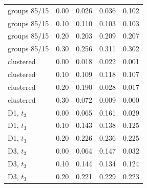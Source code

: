 {\begin{longtable}{llccc}
groups 85/15 & 0.00 & 0.026 & 0.036 & 0.102 \\
groups 85/15 & 0.10 & 0.110 & 0.103 & 0.103 \\
groups 85/15 & 0.20 & 0.203 & 0.209 & 0.207 \\
groups 85/15 & 0.30 & 0.256 & 0.311 & 0.302 \\
clustered & 0.00 & 0.018 & 0.022 & 0.001 \\
clustered & 0.10 & 0.109 & 0.118 & 0.107 \\
clustered & 0.20 & 0.190 & 0.028 & 0.017 \\
clustered & 0.30 & 0.072 & 0.009 & 0.000 \\
D1, $t_3$ & 0.00 & 0.065 & 0.161 & 0.029 \\
D1, $t_3$ & 0.10 & 0.143 & 0.138 & 0.125 \\
D1, $t_3$ & 0.20 & 0.226 & 0.236 & 0.225 \\
D3, $t_3$ & 0.00 & 0.064 & 0.147 & 0.032 \\
D3, $t_3$ & 0.10 & 0.144 & 0.134 & 0.124 \\
D3, $t_3$ & 0.20 & 0.221 & 0.229 & 0.223 \\
\bottomrule
\end{longtable}
}